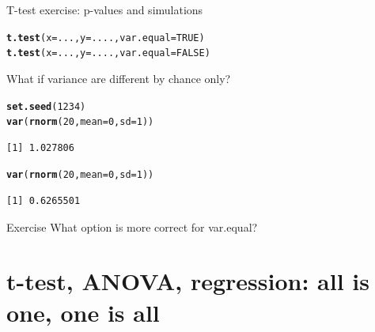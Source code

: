 \documentclass[10pt]{beamer}\usepackage[]{graphicx}\usepackage[]{color}
\makeatletter
\newcommand{\hlnum}[1]{\textcolor[rgb]{0.686,0.059,0.569}{#1}}%
\newcommand{\hlstd}[1]{\textcolor[rgb]{0.345,0.345,0.345}{#1}}%
\newcommand{\hlkwc}[1]{\textcolor[rgb]{0.333,0.667,0.333}{#1}}%
\newcommand{\hlkwd}[1]{\textcolor[rgb]{0.737,0.353,0.396}{\textbf{#1}}}%
\newenvironment{kframe}{%
 \def\at@end@of@kframe{}%
 \ifinner\ifhmode%
  \def\at@end@of@kframe{\end{minipage}}%
  \begin{minipage}{\columnwidth}%
 \fi\fi%
 \def\FrameCommand##1{\hskip\@totalleftmargin \hskip-\fboxsep
 \colorbox{shadecolor}{##1}\hskip-\fboxsep
     \hskip-\linewidth \hskip-\@totalleftmargin \hskip\columnwidth}%
 \MakeFramed {\advance\hsize-\width
   \@totalleftmargin\z@ \linewidth\hsize
   \@setminipage}}%
 {\par\unskip\endMakeFramed%
 \at@end@of@kframe}
\newenvironment{knitrout}{}{} %
\makeatother
\begin{document}
\begin{frame}[fragile]{T-test exercise: p-values and simulations}

\begin{knitrout}
\color{fgcolor}\begin{kframe}
\begin{alltt}
\hlkwd{t.test}\hlstd{(}\hlkwc{x} \hlstd{= ...,} \hlkwc{y}\hlstd{=....,} \hlkwc{var.equal} \hlstd{=} \hlnum{TRUE}\hlstd{)}
\hlkwd{t.test}\hlstd{(}\hlkwc{x} \hlstd{= ...,} \hlkwc{y}\hlstd{=....,} \hlkwc{var.equal} \hlstd{=} \hlnum{FALSE}\hlstd{)}
\end{alltt}
\end{kframe}
\end{knitrout}

What if variance are different by chance only?
\begin{knitrout}
\color{fgcolor}\begin{kframe}
\begin{alltt}
\hlkwd{set.seed}\hlstd{(}\hlnum{1234}\hlstd{)}
\hlkwd{var}\hlstd{(}\hlkwd{rnorm}\hlstd{(}\hlnum{20}\hlstd{,} \hlkwc{mean} \hlstd{=} \hlnum{0}\hlstd{,} \hlkwc{sd} \hlstd{=} \hlnum{1}\hlstd{))}
\end{alltt}
\begin{verbatim}
[1] 1.027806
\end{verbatim}
\begin{alltt}
\hlkwd{var}\hlstd{(}\hlkwd{rnorm}\hlstd{(}\hlnum{20}\hlstd{,} \hlkwc{mean} \hlstd{=} \hlnum{0}\hlstd{,} \hlkwc{sd} \hlstd{=} \hlnum{1}\hlstd{))}
\end{alltt}
\begin{verbatim}
[1] 0.6265501
\end{verbatim}
\end{kframe}
\end{knitrout}

\begin{alertblock}{Exercise}
  What option is more correct for var.equal?
\end{alertblock}

\end{frame}
\section{t-test, ANOVA, regression: all is one, one is all}
\end{document}
